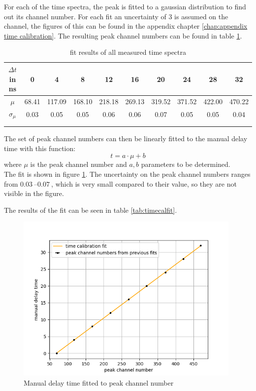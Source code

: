 For each of the time spectra, the peak is fitted to a gaussian distribution to find out its channel number. For each fit an uncertainty of 3 is assumed on the channel, the figures of this can be found in the appendix chapter \ref{chap:appendix time calibration}. The resulting peak channel numbers can be found in table \ref{tab:mu table}.\\
\begin{table}[]
    \centering
    \caption{fit results of all measured time spectra}
    \begin{tabular}{cccccccccc}
      $\Delta t$ in ns & 0 & 4 & 8 & 12 & 16 &20 & 24 & 28 & 32 \\
    \hline
    $\mu$ & 68.41 & 117.09 & 168.10 & 218.18 & 269.13
& 319.52 &371.52 & 422.00 & 470.22\\
    $\sigma_\mu$ &0.03& 0.05 &0.05 &0.06& 0.06& 0.07&
 0.05& 0.05 &0.04 \\\hline\\\\
    \end{tabular}
    \label{tab:mu table}
\end{table}{}

The set of peak channel numbers can then be linearly fitted to the manual delay time with this function: 
$$ t = a\cdot\mu +b$$
where $\mu$ is the peak channel number and $a,b$ parameters to be determined. \\The fit is shown in figure \ref{fig:timecalfit}. The uncertainty on the peak channel numbers ranges from $\SIrange{0.03}{0.07}{}$, which is very small compared to their value, so they are not visible in the figure.

The results of the fit can be seen in table \ref{tab:timecalfit}.

\begin{figure}[]
    \centering
    \includegraphics[width=110mm,scale=0.5]{Positronium/include/timecalfit.png}
    \caption{Manual delay time fitted to peak channel number} 
    \label{fig:timecalfit}
\end{figure}

